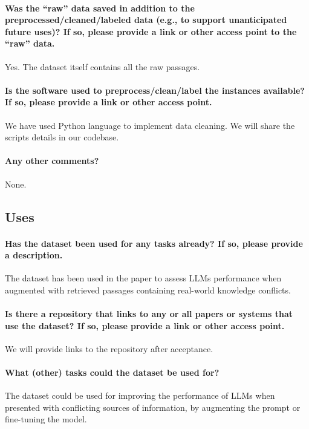\documentclass{article}
\begin{document}
\paragraph{Was the ``raw'' data saved in addition to the preprocessed/cleaned/labeled data (e.g., to support
unanticipated future uses)? If so, please provide a link or other access point to the ``raw'' data.}
Yes. The dataset itself contains all the raw passages.

\paragraph{Is the software used to preprocess/clean/label the instances available? If so, please provide a link or other access point.}
We have used Python language to implement data cleaning. We will share the scripts details in our codebase.

\paragraph{Any other comments?}
None.

\subsection{Uses}
\paragraph{Has the dataset been used for any tasks already? If so, please provide a description.}
The dataset has been used in the paper to assess LLMs performance when augmented with retrieved passages containing real-world knowledge conflicts.

\paragraph{Is there a repository that links to any or all papers or systems that use the dataset? If so, please
provide a link or other access point.}
We will provide links to the repository after acceptance.

\paragraph{What (other) tasks could the dataset be used for?}
The dataset could be used for improving the performance of LLMs when presented with conflicting sources of information, by augmenting the prompt or fine-tuning the model.
\end{document}
